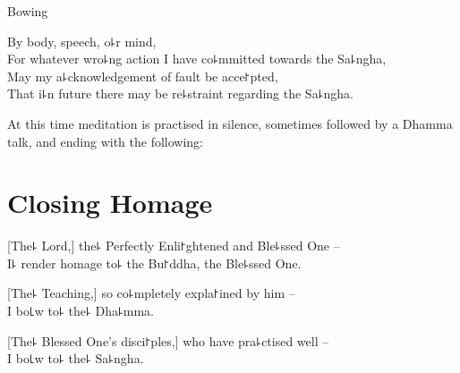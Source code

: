 \begin{instruction}
  Bowing
\end{instruction}

By body, speech, o꜕r mind,\\
For whatever wro꜕ng action I have co꜕mmitted towards the Sa꜕ngha,\\
May my a꜕cknowledgement of fault be acce꜓pted,\\
That i꜕n future there may be re꜕straint regarding the Sa꜕ngha.

\vfill

\begin{instruction}
  At this time meditation is practised in silence, sometimes followed by a Dhamma talk, and ending with the following:
\end{instruction}

\chapter{Closing Homage}%

[The꜕ Lord,] the꜕ Perfectly Enli꜓ghtened and Ble꜕ssed One --\\
I꜕ render homage to꜕ the Bu꜓ddha, the Ble꜕ssed One. 

[The꜕ Teaching,] so co꜕mpletely expla꜓ined by him --\\
I bo꜖w to꜕ the꜕ Dha꜕mma. 

[The꜕ Blessed One's disci꜓ples,] who have pra꜕ctised well --\\
I bo꜖w to꜕ the꜕ Sa꜕ngha. 


